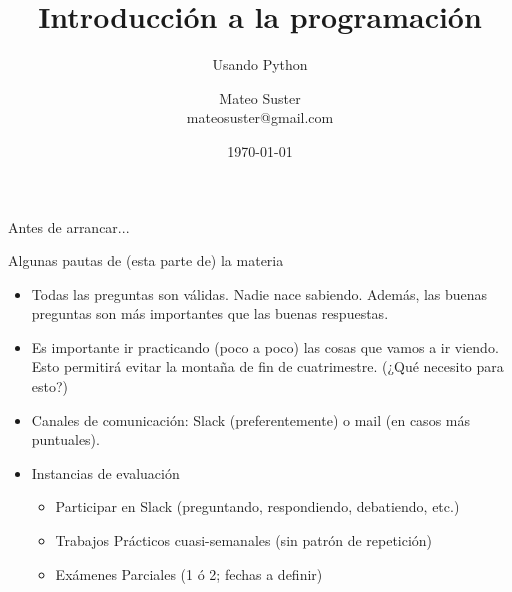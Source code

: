 \documentclass{beamer}
\title[Intro Prog] %
{Introducción a la programación}
\subtitle
{Usando Python}
\author[MS]
{Mateo Suster \\ mateosuster@gmail.com}%
\institute[UNGS] %
{
  Matemática para Economistas III \\ 
  Instituto de Industria\\
  Universidad Nacional de General Sarmiento
}
\date[] %
{ \today}
\begin{document}
\begin{frame}
  \titlepage
\end{frame}


\begin{frame}{Antes de arrancar...}
  \begin{block}{Algunas pautas de (esta parte de) la materia}
  \end{block}\pause
  \begin{itemize}
  	\item Todas las preguntas son válidas. \pause 
  	Nadie nace sabiendo. \pause Además, las buenas preguntas son más importantes que las buenas respuestas. \pause
	\item Es importante ir practicando (poco a poco) las cosas que vamos a ir viendo. \pause Esto permitirá evitar la montaña de fin de cuatrimestre. \pause (¿Qué necesito para esto?) \pause
	\item Canales de comunicación: \pause Slack (preferentemente) o mail (en casos más puntuales). \pause
	\item Instancias de evaluación \pause
		\begin{itemize}
			\item Participar en Slack (preguntando, respondiendo, debatiendo, etc.) \pause
			\item Trabajos Prácticos cuasi-semanales (sin patrón de repetición)\pause
			\item Exámenes Parciales (1 ó 2; fechas a definir)
		\end{itemize}	
  \end{itemize}
\end{frame}
\end{document}
